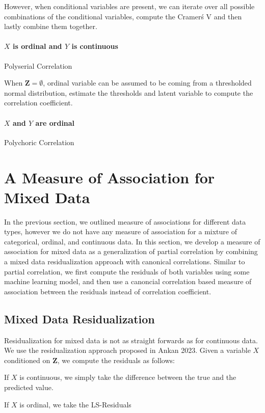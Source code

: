 \documentclass[letterpaper]{article} %
\begin{document}
However, when conditional variables are present, we can iterate over all
possible combinations of the conditional variables, compute the Cramer\'s V and
then lastly combine them together. 


\paragraph{$ X $ is ordinal and $ Y $ is continuous}
Polyserial Correlation

When $ \bm{Z} = \emptyset $, ordinal variable can be assumed to be coming from a thresholded normal distribution, estimate the thresholds and latent variable to compute 
the correlation coefficient.

\paragraph{$ X $ and $ Y $ are ordinal}
Polychoric Correlation

\section{A Measure of Association for Mixed Data}
In the previous section, we outlined measure of associations for different data
types, however we do not have any measure of association for a mixture of
categorical, ordinal, and continuous data. In this section, we develop a
measure of association for mixed data as a generalization of partial
correlation by combining a mixed data residualization approach with canonical
correlations. Similar to partial correlation, we first compute the residuals of
both variables using some machine learning model, and then use a canoncial
correlation based measure of association between the residuals instead of
correlation coefficient.

\subsection{Mixed Data Residualization}
Residualization for mixed data is not as straight forwards as for continuous
data. We use the residualization approach proposed in Ankan 2023. Given a variable
$ X $ conditioned on $ \bm{Z} $, we compute the residuals as follows:

If $ X $ is continuous, we simply take the difference between the true and the 
predicted value.

If $ X $ is ordinal, we take the LS-Residuals
\end{document}
